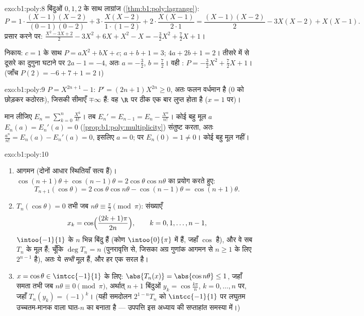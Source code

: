 \begin{solution}{exo:b1:poly:8}
बिंदुओं $0, 1, 2$ के साथ लाग्रांज (\cref{thm:b1:poly:lagrange}):
\[
P = 1\cdot\frac{(X-1)(X-2)}{(0-1)(0-2)} + 3\cdot\frac{X(X-2)}{1\cdot(1-2)}
+ 2\cdot\frac{X(X-1)}{2\cdot 1}
= \frac{(X-1)(X-2)}{2} - 3X(X-2) + X(X-1).
\]
प्रसार करने पर: $\frac{X^2 - 3X + 2}{2} - 3X^2 + 6X + X^2 - X =
-\frac{3}{2}X^2 + \frac{7}{2}X + 1$।

निकाय: $c = 1$ के साथ $P = aX^2 + bX + c$; $a + b + 1 = 3$; $4a + 2b + 1 =
2$। तीसरे में से दूसरे का दुगुना घटाने पर $2a - 1 = -4$, अतः $a = -\frac32$,
$b = \frac72$। वही : $P = -\frac32 X^2 + \frac72 X + 1$। (जाँच $P(2) =
-6 + 7 + 1 = 2$।)
\end{solution}

\begin{solution}{exo:b1:poly:9}
$P = X^{2n+1} - 1$: $P' = (2n+1)X^{2n} \geq 0$, अतः  फलन वर्धमान है
($0$ को छोड़कर कठोरतः), जिसकी सीमाएँ $\mp\infty$ हैं: वह $\R$ पर ठीक एक बार
लुप्त होता है ($x = 1$ पर)।

मान लीजिए $E_n = \sum_{k=0}^{n} \frac{X^k}{k!}$। तब $E_n' = E_{n-1} = E_n -
\frac{X^n}{n!}$। कोई बहु मूल $a$ $E_n(a) = E_n'(a) = 0$
(\cref{prop:b1:poly:multiplicity}) संतुष्ट करता, अतः $\frac{a^n}{n!} =
E_n(a) - E_n'(a) = 0$, इसलिए $a = 0$; पर $E_n(0) = 1 \neq 0$। कोई बहु मूल
नहीं।
\end{solution}

\begin{solution}{exo:b1:poly:10}
\begin{enumerate}
  \item आगमन (दोनों आधार स्थितियाँ सत्य हैं)। $\cos(n+1)\theta +
  \cos(n-1)\theta = 2\cos\theta\cos n\theta$ का प्रयोग करते हुए:
        \[
        T_{n+1}(\cos\theta) = 2\cos\theta \cos n\theta -
        \cos(n-1)\theta = \cos(n+1)\theta .
        \]
  \item $T_n(\cos\theta) = 0$ तभी जब $n\theta \equiv \frac\pi2 \pmod \pi$:
  संख्याएँ
        \[
        x_k = \cos\Bigl(\frac{(2k+1)\pi}{2n}\Bigr),
        \qquad k = 0, 1, \dots, n-1,
        \]
        $\intoo{-1}{1}$ के $n$ भिन्न बिंदु हैं (कोण $\intoo{0}{\pi}$ में
        हैं, जहाँ $\cos$  है), और वे सब $T_n$ के मूल हैं; चूँकि $\deg
        T_n = n$ (पुनरावृत्ति से, जिसका अग्र गुणांक आगमन से $n \geq 1$ के
        लिए $2^{n-1}$ है), अतः ये \emph{सभी} मूल हैं, और हर एक सरल है।
  \item $x = \cos\theta \in \intcc{-1}{1}$ के लिए: $\abs{T_n(x)} = \abs{\cos
  n\theta} \leq 1$, जहाँ समता तभी जब $n\theta \equiv 0 \pmod\pi$, अर्थात्
  $n+1$ बिंदुओं $y_k = \cos\frac{k\pi}{n}$, $k = 0, \dots, n$ पर, जहाँ
  $T_n(y_k) = (-1)^k$। (यही समदोलन $2^{1-n}T_n$ को $\intcc{-1}{1}$ पर लघुतम
  उच्चतम-मानक वाला घात-$n$ का  बनाता है --- उपपत्ति इस अध्याय
  की सप्ताहांत समस्या में।)
\end{enumerate}
\end{solution}

